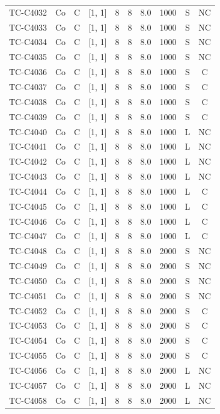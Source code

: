 \begin{longtable}{lccccccccc}
TC-C4032 & Co & C & [1, 1] & 8 & 8 & 8.0 & 1000 & S & NC \\
TC-C4033 & Co & C & [1, 1] & 8 & 8 & 8.0 & 1000 & S & NC \\
TC-C4034 & Co & C & [1, 1] & 8 & 8 & 8.0 & 1000 & S & NC \\
TC-C4035 & Co & C & [1, 1] & 8 & 8 & 8.0 & 1000 & S & NC \\
TC-C4036 & Co & C & [1, 1] & 8 & 8 & 8.0 & 1000 & S & C \\
TC-C4037 & Co & C & [1, 1] & 8 & 8 & 8.0 & 1000 & S & C \\
TC-C4038 & Co & C & [1, 1] & 8 & 8 & 8.0 & 1000 & S & C \\
TC-C4039 & Co & C & [1, 1] & 8 & 8 & 8.0 & 1000 & S & C \\
TC-C4040 & Co & C & [1, 1] & 8 & 8 & 8.0 & 1000 & L & NC \\
TC-C4041 & Co & C & [1, 1] & 8 & 8 & 8.0 & 1000 & L & NC \\
TC-C4042 & Co & C & [1, 1] & 8 & 8 & 8.0 & 1000 & L & NC \\
TC-C4043 & Co & C & [1, 1] & 8 & 8 & 8.0 & 1000 & L & NC \\
TC-C4044 & Co & C & [1, 1] & 8 & 8 & 8.0 & 1000 & L & C \\
TC-C4045 & Co & C & [1, 1] & 8 & 8 & 8.0 & 1000 & L & C \\
TC-C4046 & Co & C & [1, 1] & 8 & 8 & 8.0 & 1000 & L & C \\
TC-C4047 & Co & C & [1, 1] & 8 & 8 & 8.0 & 1000 & L & C \\
TC-C4048 & Co & C & [1, 1] & 8 & 8 & 8.0 & 2000 & S & NC \\
TC-C4049 & Co & C & [1, 1] & 8 & 8 & 8.0 & 2000 & S & NC \\
TC-C4050 & Co & C & [1, 1] & 8 & 8 & 8.0 & 2000 & S & NC \\
TC-C4051 & Co & C & [1, 1] & 8 & 8 & 8.0 & 2000 & S & NC \\
TC-C4052 & Co & C & [1, 1] & 8 & 8 & 8.0 & 2000 & S & C \\
TC-C4053 & Co & C & [1, 1] & 8 & 8 & 8.0 & 2000 & S & C \\
TC-C4054 & Co & C & [1, 1] & 8 & 8 & 8.0 & 2000 & S & C \\
TC-C4055 & Co & C & [1, 1] & 8 & 8 & 8.0 & 2000 & S & C \\
TC-C4056 & Co & C & [1, 1] & 8 & 8 & 8.0 & 2000 & L & NC \\
TC-C4057 & Co & C & [1, 1] & 8 & 8 & 8.0 & 2000 & L & NC \\
TC-C4058 & Co & C & [1, 1] & 8 & 8 & 8.0 & 2000 & L & NC \\

\end{longtable}
